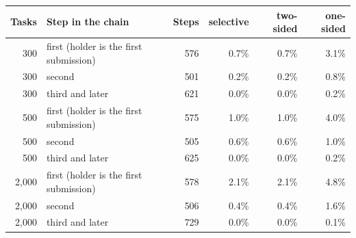 \begin{tabular}{rlrrrr}
\toprule
Tasks & Step in the chain & Steps & selective & two-sided & one-sided \\
\midrule
300 & first (holder is the first submission) & 576 & 0.7\% & 0.7\% & 3.1\% \\
300 & second & 501 & 0.2\% & 0.2\% & 0.8\% \\
300 & third and later & 621 & 0.0\% & 0.0\% & 0.2\% \\
500 & first (holder is the first submission) & 575 & 1.0\% & 1.0\% & 4.0\% \\
500 & second & 505 & 0.6\% & 0.6\% & 1.0\% \\
500 & third and later & 625 & 0.0\% & 0.0\% & 0.2\% \\
2,000 & first (holder is the first submission) & 578 & 2.1\% & 2.1\% & 4.8\% \\
2,000 & second & 506 & 0.4\% & 0.4\% & 1.6\% \\
2,000 & third and later & 729 & 0.0\% & 0.0\% & 0.1\% \\
\bottomrule
\end{tabular}
